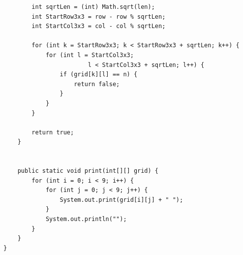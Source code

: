 \documentclass[11pt]{article}
\begin{document}
\begin{appendices}
\begin{lstlisting}
        int sqrtLen = (int) Math.sqrt(len);
        int StartRow3x3 = row - row % sqrtLen;
        int StartCol3x3 = col - col % sqrtLen;

        for (int k = StartRow3x3; k < StartRow3x3 + sqrtLen; k++) {
            for (int l = StartCol3x3; 
                        l < StartCol3x3 + sqrtLen; l++) {
                if (grid[k][l] == n) {
                    return false;
                }
            }
        }

        return true;
    }


    public static void print(int[][] grid) {
        for (int i = 0; i < 9; i++) {
            for (int j = 0; j < 9; j++) {
                System.out.print(grid[i][j] + " ");
            }
            System.out.println("");
        }
    }
}

\end{lstlisting}


\end{appendices}
\end{document}
